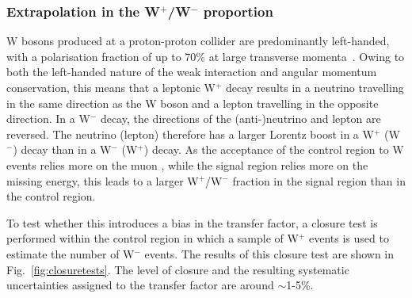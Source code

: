 \subsubsection{Extrapolation in the W$^+$/W$^-$ proportion}
W bosons produced at a proton-proton collider are predominantly left-handed, 
with a polarisation fraction of up to 70\% at large transverse 
momenta~\cite{wpol11}. Owing to both the left-handed nature of the weak 
interaction and angular momentum conservation, this means that a leptonic W$^+$ 
decay results in a neutrino travelling in the same direction as the W boson and 
a lepton travelling in the opposite direction. In a W$^-$ decay, the directions 
of the (anti-)neutrino and lepton are reversed. 
The neutrino (lepton) therefore has a larger Lorentz boost in a W$^+$ (W$^-$) 
decay than in a W$^-$ (W$^+$) decay.
As the acceptance of the \mj control region to W events relies more on the muon 
\pt, while the signal region relies more on the missing energy, this leads to a 
larger W$^+$/W$^-$ fraction in the signal region than in the \mj control region.

To test whether this introduces a bias in the \Tmutottw transfer factor, a 
closure test is performed within the \mj control region in which a sample of 
W$^+$ events is used to estimate the number of W$^-$ events.
The results of this closure test are shown in Fig.~\ref{fig:closuretests}. The 
level of closure and the resulting systematic uncertainties assigned to the 
\Tmutottw transfer factor are around $\sim$1-5\%.


